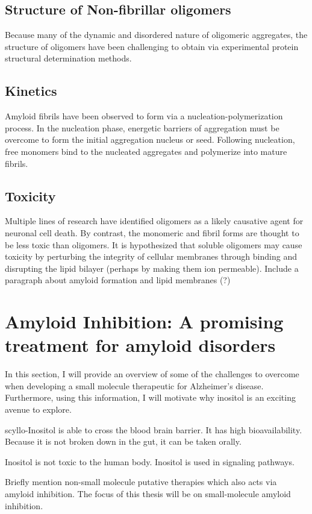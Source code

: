   \subsection{Structure of Non-fibrillar oligomers}
   Because many of the dynamic and disordered nature of oligomeric aggregates, the structure of oligomers have been challenging to obtain via experimental protein structural determination methods.
	
  \subsection{Kinetics}
  Amyloid fibrils have been observed to form via a nucleation-polymerization process. In the nucleation phase, energetic barriers of aggregation must be overcome to form the initial aggregation nucleus or seed.  Following nucleation, free monomers bind to the nucleated aggregates and polymerize into mature fibrils.\cite{Murphy:2002fe}
    
  \subsection{Toxicity}
  \begin{outline}
  	\1 Multiple lines of research have identified oligomers as a likely causative agent for neuronal cell death. By contrast, the monomeric and fibril forms are thought to be less toxic than oligomers. It is hypothesized that soluble oligomers may cause toxicity by perturbing the integrity of cellular membranes through binding and disrupting the lipid bilayer (perhaps by making them ion permeable). \cite{Walsh:2007fu}
  	\1 Include a paragraph about amyloid formation and lipid membranes (?)
  \end{outline}


\section{Amyloid Inhibition: A promising treatment for amyloid disorders}
\begin{outline}
	\1 In this section, I will provide an overview of some of the challenges to overcome when developing a small molecule therapeutic for Alzheimer's disease.  Furthermore, using this information, I will motivate why inositol is an exciting avenue to explore.
	
	  \2 scyllo-Inositol is able to cross the blood brain barrier. It has high bioavailability. Because it is not broken down in the gut, it can be taken orally.
	  
	  \2 Inositol is not toxic to the human body.  Inositol is used in signaling pathways.

	\1 Briefly mention non-small molecule putative therapies which also acts via amyloid inhibition. The focus of this thesis will be on small-molecule amyloid inhibition.
\end{outline}

